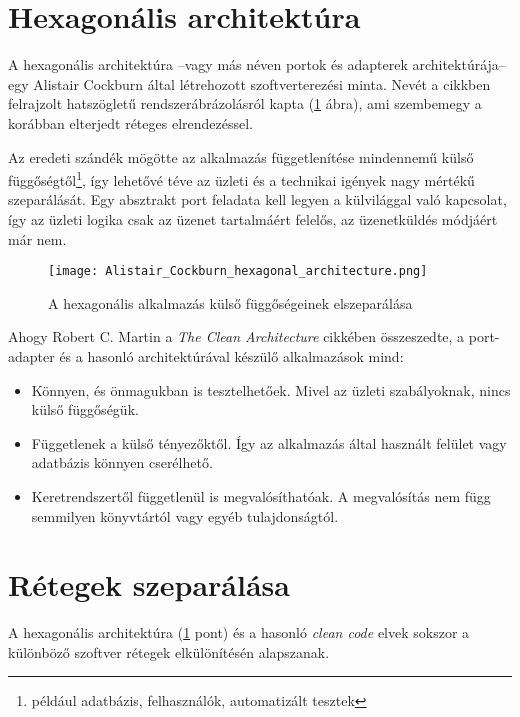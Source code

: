 \section{Hexagonális architektúra}\label{sec:hexagonalis_architektura}
A hexagonális architektúra --vagy más néven portok és adapterek architektúrája-- egy \foreignlanguage{british}{Alistair Cockburn} által létrehozott \cite{Alistair_Cockburn} szoftverterezési minta. Nevét a cikkben felrajzolt hatszögletű rendszerábrázolásról kapta (\ref{fig:Alistair_Cockburn_hexagonal_architecture} ábra), ami szembemegy a korábban elterjedt réteges elrendezéssel.

Az eredeti szándék mögötte az alkalmazás függetlenítése mindennemű külső függőségtől\footnote{például adatbázis, felhasználók, automatizált tesztek}, így lehetővé téve az üzleti és a technikai igények nagy mértékű szeparálását.
Egy absztrakt port feladata kell legyen a külvilággal való kapcsolat, így az üzleti logika csak az üzenet tartalmáért felelős, az üzenetküldés módjáért már nem.

\begin{figure}[hbt] 
	\centering
	\texttt{[image: Alistair\_Cockburn\_hexagonal\_architecture.png]}
	\caption[Hexagonális alkalmazások felépítése]{
		A hexagonális alkalmazás külső függőségeinek elszeparálása}
	\label{fig:Alistair_Cockburn_hexagonal_architecture}
\end{figure}



Ahogy \foreignlanguage{british}{Robert C. Martin} a \foreignlanguage{british}{\textit{The Clean Architecture}} cikkében \cite{The_Clean_Architecture} összeszedte, a port-adapter és a hasonló architektúrával készülő alkalmazások mind:	
\begin{itemize}
	\item Könnyen, és önmagukban is tesztelhetőek. Mivel az üzleti szabályoknak, nincs külső függőségük.
	
	\item Függetlenek a külső tényezőktől. Így az alkalmazás által használt felület vagy adatbázis könnyen cserélhető.
	
	\item Keretrendszertől függetlenül is megvalósíthatóak. A megvalósítás nem függ semmilyen könyvtártól vagy egyéb tulajdonságtól.
\end{itemize}
	


\section{Rétegek szeparálása}\label{sec:retegek_szeparalasa}
A hexagonális architektúra (\ref{sec:hexagonalis_architektura} pont) és a hasonló \textit{clean code} \cite{clean_code_chapter_systems} elvek sokszor a különböző szoftver rétegek elkülönítésén alapszanak.


